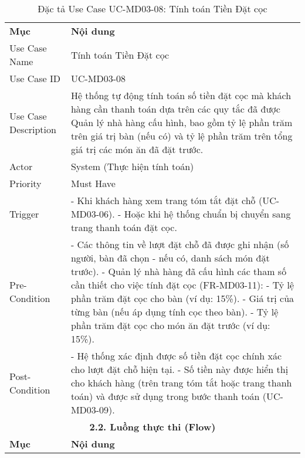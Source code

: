 \begin{longtable}{|m{4cm}|p{11cm}|}
\caption{Đặc tả Use Case UC-MD03-08: Tính toán Tiền Đặt cọc} \label{tab:uc_md03_08} \\
\hline

\endhead %
\hline
\endfoot %
\hline
\endlastfoot %
\multicolumn{2}{|c|}{\textbf{2.1. Tóm tắt (Summary)}} \\
\hline
\textbf{Mục} & \textbf{Nội dung} \\
\hline
Use Case Name & Tính toán Tiền Đặt cọc \\
\hline
Use Case ID & UC-MD03-08 \\
\hline
Use Case Description & Hệ thống tự động tính toán số tiền đặt cọc mà khách hàng cần thanh toán dựa trên các quy tắc đã được Quản lý nhà hàng cấu hình, bao gồm tỷ lệ phần trăm trên giá trị bàn (nếu có) và tỷ lệ phần trăm trên tổng giá trị các món ăn đã đặt trước. \\
\hline
Actor & System (Thực hiện tính toán) \\
\hline
Priority & Must Have \\
\hline
Trigger & - Khi khách hàng xem trang tóm tắt đặt chỗ (UC-MD03-06). \newline - Hoặc khi hệ thống chuẩn bị chuyển sang trang thanh toán đặt cọc. \\
\hline
Pre-Condition & - Các thông tin về lượt đặt chỗ đã được ghi nhận (số người, bàn đã chọn - nếu có, danh sách món đặt trước). \newline - Quản lý nhà hàng đã cấu hình các tham số cần thiết cho việc tính đặt cọc (FR-MD03-11): \newline    - Tỷ lệ phần trăm đặt cọc cho bàn (ví dụ: 15\%). \newline    - Giá trị của từng bàn (nếu áp dụng tính cọc theo bàn). \newline    - Tỷ lệ phần trăm đặt cọc cho món ăn đặt trước (ví dụ: 15\%). \\
\hline
Post-Condition & - Hệ thống xác định được số tiền đặt cọc chính xác cho lượt đặt chỗ hiện tại. \newline - Số tiền này được hiển thị cho khách hàng (trên trang tóm tắt hoặc trang thanh toán) và được sử dụng trong bước thanh toán (UC-MD03-09). \\
\hline
\multicolumn{2}{|c|}{\textbf{2.2. Luồng thực thi (Flow)}} \\
\hline
\textbf{Mục} & \textbf{Nội dung} \\
\hline

\end{longtable}
